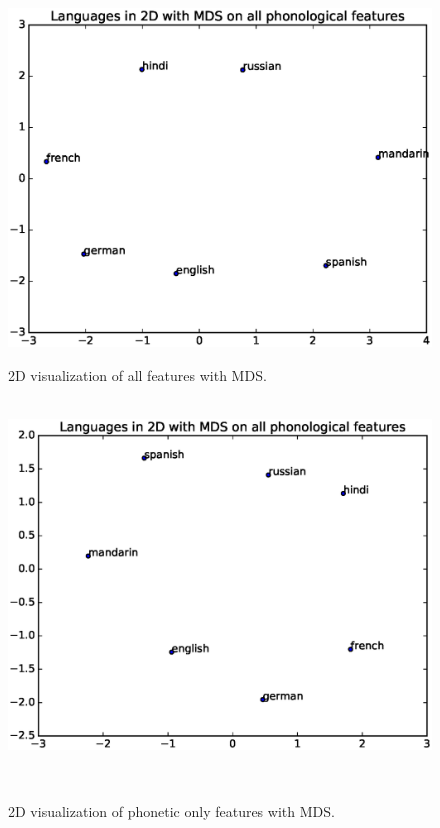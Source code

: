 \begin{figure}
\centering
{}
  \includegraphics[width=\linewidth]{figures/all_MDS.eps}
  \caption{2D visualization of all features with MDS.}\label{fig:all_mds}
\endminipage\hfill
\\
  \includegraphics[width=\linewidth]{figures/phono_MDS_wals.eps}
  \caption{2D visualization of phonetic only features with MDS.}\label{fig:phonetic_mds}
\endminipage\hfill
\\
%

\end{figure}
